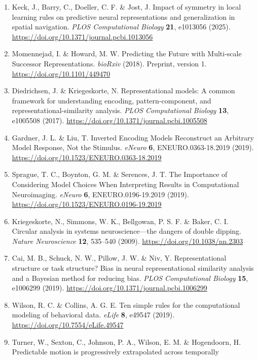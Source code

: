 \documentclass[11pt,a4paper]{article}
\begin{document}
\begin{enumerate}
  \url{https://doi.org/10.1038/s41562-024-01930-8}
\item
  Keck, J., Barry, C., Doeller, C. F. \& Jost, J. Impact of symmetry in
  local learning rules on predictive neural representations and
  generalization in spatial navigation. \emph{PLOS Computational
  Biology} \textbf{21}, e1013056 (2025).
  \url{https://doi.org/10.1371/journal.pcbi.1013056}
\item
  Momennejad, I. \& Howard, M. W. Predicting the Future with Multi-scale
  Successor Representations. \emph{bioRxiv} (2018). Preprint, version 1.
  \url{https://doi.org/10.1101/449470}
\item
  Diedrichsen, J. \& Kriegeskorte, N. Representational models: A common
  framework for understanding encoding, pattern-component, and
  representational-similarity analysis. \emph{PLOS Computational
  Biology} \textbf{13}, e1005508 (2017).
  \url{https://doi.org/10.1371/journal.pcbi.1005508}
\item
  Gardner, J. L. \& Liu, T. Inverted Encoding Models Reconstruct an
  Arbitrary Model Response, Not the Stimulus. \emph{eNeuro} \textbf{6},
  ENEURO.0363-18.2019 (2019).
  \url{https://doi.org/10.1523/ENEURO.0363-18.2019}
\item
  Sprague, T. C., Boynton, G. M. \& Serences, J. T. The Importance of
  Considering Model Choices When Interpreting Results in Computational
  Neuroimaging. \emph{eNeuro} \textbf{6}, ENEURO.0196-19.2019 (2019).
  \url{https://doi.org/10.1523/ENEURO.0196-19.2019}
\item
  Kriegeskorte, N., Simmons, W. K., Bellgowan, P. S. F. \& Baker, C. I.
  Circular analysis in systems neuroscience—the dangers of double
  dipping. \emph{Nature Neuroscience} \textbf{12}, 535–540 (2009).
  \url{https://doi.org/10.1038/nn.2303}
\item
  Cai, M. B., Schuck, N. W., Pillow, J. W. \& Niv, Y. Representational
  structure or task structure? Bias in neural representational
  similarity analysis and a Bayesian method for reducing bias.
  \emph{PLOS Computational Biology} \textbf{15}, e1006299 (2019).
  \url{https://doi.org/10.1371/journal.pcbi.1006299}
\item
  Wilson, R. C. \& Collins, A. G. E. Ten simple rules for the
  computational modeling of behavioral data. \emph{eLife} \textbf{8},
  e49547 (2019). \url{https://doi.org/10.7554/eLife.49547}
\item
  Turner, W., Sexton, C., Johnson, P. A., Wilson, E. M. \& Hogendoorn,
  H. Predictable motion is progressively extrapolated across temporally

\end{enumerate}
\end{document}
